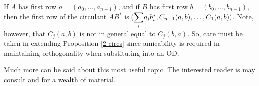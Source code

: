 \documentclass[../../../main]{subfiles}
\begin{document}
 If $A$ has first row $a=(a_0,\dots,a_{n-1})$, and if $B$ has first row $b=(b_0,\dots,b_{n-1})$, then the first row of the circulant $AB^*$ is $(\ssum_ia_ib_i^*,C_{n-1}(a,b),\dots,C_1(a,b))$. Note, however, that $C_j(a,b)$ is not in general equal to $C_j(b,a)$. So, care must be taken in extending Proposition \ref{2-circs} since amicability is required in maintaining orthogonality when substituting into an OD.
 
 Much more can be said about this most useful topic. The interested reader is may consult \cite{seberry-od-2017} and \cite{seberry-yamada-hmatrices-designs} for a wealth of material.
 
 \biblio
\end{document}
